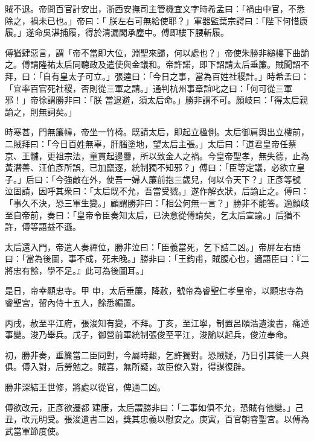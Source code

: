 \begin{pinyinscope}
 賊不退。帝問百官計安出，浙西安撫司主管機宜文字時希孟曰：「禍由中官，不悉除之，禍未已也。」帝曰：「
 朕左右可無給使耶？」軍器監葉宗諤曰：「陛下何惜康履。」遂命吳湛捕履，得於清漏閣承塵中。傅即樓下腰斬履。



 傅猶肆惡言，謂「帝不當即大位，淵聖來歸，何以處也？」帝使朱勝非縋樓下曲諭之。傅請隆祐太后同聽政及遣使與金議和。帝許諾，即下詔請太后垂簾。賊聞詔不拜，曰：「自有皇太子可立。」張逵曰：「今日之事，當為百姓社稷計。」時希孟曰：「宜率百官死社稷，否則從三軍之請。」通判杭州事章誼叱之曰：「何可從三軍邪！」帝徐謂勝非曰：「朕
 當退避，須太后命。」勝非謂不可。顏岐曰：「得太后親諭之，則無詞矣。」



 時寒甚，門無簾幃，帝坐一竹椅。既請太后，即起立楹側。太后御肩輿出立樓前，二賊拜曰：「今日百姓無辜，肝腦塗地，望太后主張。」太后曰：「道君皇帝任蔡京、王黼，更祖宗法，童貫起邊釁，所以致金人之禍。今皇帝聖孝，無失德，止為黃潛善、汪伯彥所誤，已加竄逐，統制獨不知邪？」傅曰：「臣等定議，必欲立皇子。」后曰：「今強敵在外，使吾一婦人簾前抱三歲兒，何以令天下？」正彥等號
 泣固請，因呼其衆曰：「太后既不允，吾當受戮。」遂作解衣狀，后諭止之。傅曰：「事久不決，恐三軍生變。」顧謂勝非曰：「相公何無一言？」勝非不能答。適顏岐至自帝前，奏曰：「皇帝令臣奏知太后，已決意從傅請矣，乞太后宣諭。」后猶不許，傅等語益不遜。



 太后還入門，帝遣人奏禪位，勝非泣曰：「臣義當死，乞下詰二凶。」帝屏左右語曰：「當為後圖，事不成，死未晚。」勝非曰：「王鈞甫，賊腹心也，適語臣曰：『二將忠有餘，學不足。』此可為後圖耳。」



 是日，帝幸顯忠寺。甲
 申，太后垂簾，降赦，號帝為睿聖仁孝皇帝，以顯忠寺為睿聖宮，留內侍十五人，餘悉編置。



 丙戌，赦至平江府，張浚知有變，不拜。丁亥，至江寧，制置呂頤浩遺浚書，痛述事變。浚乃舉兵。戊子，御營前軍統制張俊至平江，浚諭以起兵，俊泣奉命。



 初，勝非奏，垂簾當二臣同對，今屬時艱，乞許獨對。恐賊疑，乃日引其徒一人與俱。傅入對，后勞勉之。賊喜，無所疑，故臣僚入對，得謀復辟。



 勝非深結王世修，將處以從官，俾通二凶。



 傅欲改元，正彥欲遷都
 建康，太后謂勝非曰：「二事如俱不允，恐賊有他變。」己丑，改元明受。張浚遺書二凶，獎其忠義以慰安之。庚寅，百官朝睿聖宮。以傅為武當軍節度使。




\end{pinyinscope}
